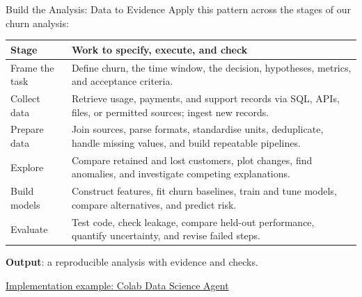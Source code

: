 \documentclass[aspectratio=169]{beamer}
\begin{document}
\begin{frame}{Build the Analysis: Data to Evidence}
  \small
  Apply this pattern across the stages of our churn analysis:
  \vspace{0.2em}
  {\fontsize{9}{10.2}\selectfont\renewcommand{\arraystretch}{1.1}
  \begin{tabular}{@{}>{\raggedright\arraybackslash}p{2.3cm}>{\raggedright\arraybackslash}p{10.1cm}@{}}
    \toprule
    \textbf{Stage} & \textbf{Work to specify, execute, and check} \\
    \midrule
    Frame the task & Define churn, the time window, the decision, hypotheses, metrics, and acceptance criteria. \\
    Collect data & Retrieve usage, payments, and support records via SQL, APIs, files, or permitted sources; ingest new records. \\
    Prepare data & Join sources, parse formats, standardise units, deduplicate, handle missing values, and build repeatable pipelines. \\
    Explore & Compare retained and lost customers, plot changes, find anomalies, and investigate competing explanations. \\
    Build models & Construct features, fit churn baselines, train and tune models, compare alternatives, and predict risk. \\
    Evaluate & Test code, check leakage, compare held-out performance, quantify uncertainty, and revise failed steps. \\
    \bottomrule
  \end{tabular}}\par
  \vspace{0.2em}
  \textbf{Output}: a reproducible analysis with evidence and checks.
  \par\vspace{0.1em}
  {\scriptsize\href{https://docs.cloud.google.com/colab/docs/use-data-science-agent}{Implementation example: Colab Data Science Agent}}
\end{frame}
\end{document}
